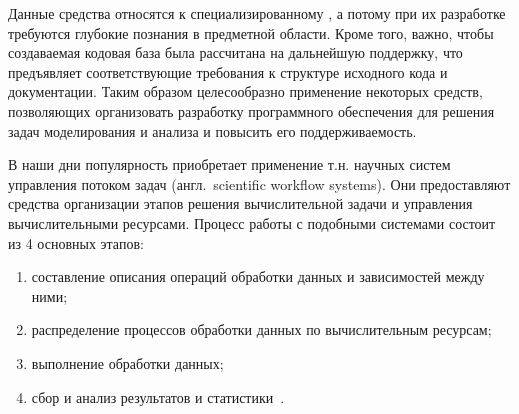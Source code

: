 Данные средства относятся к специализированному , а потому при их разработке требуются глубокие познания в предметной области. Кроме того, важно, чтобы создаваемая кодовая база была рассчитана на дальнейшую поддержку, что предъявляет соответствующие требования к структуре исходного кода и документации. Таким образом целесообразно применение некоторых средств, позволяющих организовать разработку программного обеспечения для решения задач моделирования и анализа и повысить его поддерживаемость.

В наши дни популярность приобретает применение т.н. научных систем управления потоком задач (англ.~scientific workflow systems). Они предоставляют средства организации этапов решения вычислительной задачи и управления вычислительными ресурсами. Процесс работы с подобными системами состоит из 4 основных этапов:
\begin{enumerate}[1)]
  \item составление описания операций обработки данных и зависимостей между ними;
  \item распределение процессов обработки данных по вычислительным ресурсам;
  \item выполнение обработки данных;
  \item сбор и анализ результатов и статистики~\cite{DeelmanWorkflow2009}.
\end{enumerate}

